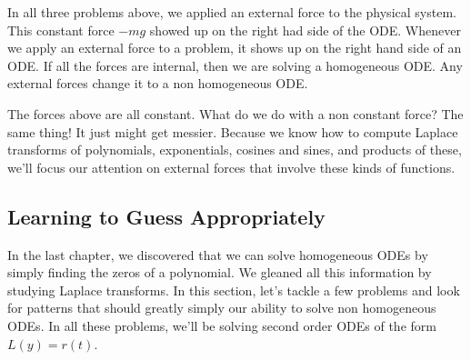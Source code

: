 In all three problems above, we applied an external force to the physical system.  This constant force $-mg$ showed up on the right had side of the ODE. Whenever we apply an external force to a problem, it shows up on the right hand side of an ODE. If all the forces are internal, then we are solving a homogeneous ODE.  Any external forces change it to a non homogeneous ODE.

The forces above are all constant.  What do we do with a non constant force?  The same thing! It just might get messier. 
Because we know how to compute Laplace transforms of polynomials, exponentials, cosines and sines, and products of these, we'll focus our attention on external forces that involve these kinds of functions.

\subsection*{Learning to Guess Appropriately}

In the last chapter, we discovered that we can solve homogeneous ODEs by simply finding the zeros of a polynomial.  We gleaned all this information by studying Laplace transforms. In this section, let's tackle a few problems and look for patterns that should greatly simply our ability to solve non homogeneous ODEs.  
In all these problems, we'll be solving second order ODEs of the form $L(y)=r(t)$.

